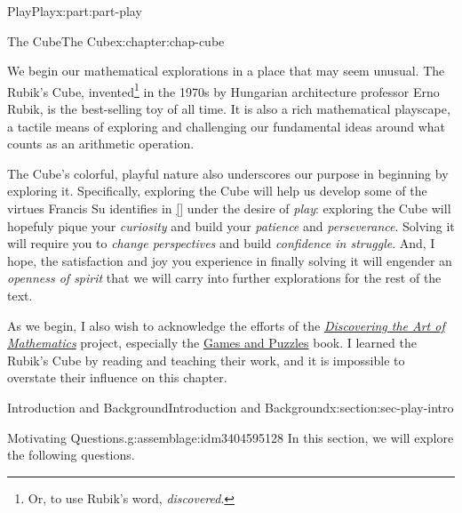 \documentclass[oneside,10pt,]{book}
\newcommand{\xreffont}{\relax}
\numberwithin{equation}{section}
\begin{document}
\begin{partptx}{Play}{}{Play}{}{}{x:part:part-play}
%
\typeout{************************************************}
\typeout{************************************************}
%
\begin{chapterptx}{The Cube}{}{The Cube}{}{}{x:chapter:chap-cube}
\begin{introduction}{}%
We begin our mathematical explorations in a place that may seem unusual. The Rubik's Cube, invented\footnote{Or, to use Rubik's word, \emph{discovered}.\label{g:fn:idm3404603496}} in the 1970s by Hungarian architecture professor Erno Rubik, is the best-selling toy of all time. It is also a rich mathematical playscape, a tactile means of exploring and challenging our fundamental ideas around what counts as an arithmetic operation.%
\par
The Cube's colorful, playful nature also underscores our purpose in beginning by exploring it. Specifically, exploring the Cube will help us develop some of the virtues Francis Su identifies in \hyperlink{x:biblio:Su2020}{[{\xreffont 1}]} under the desire of \emph{play}: exploring the Cube will hopefuly pique your \emph{curiosity} and build your \emph{patience} and \emph{perseverance}. Solving it will require you to \emph{change perspectives} and build \emph{confidence in struggle}. And, I hope, the satisfaction and joy you experience in finally solving it will engender an \emph{openness of spirit} that we will carry into further explorations for the rest of the text.%
\par
As we begin, I also wish to acknowledge the efforts of the \emph{\href{https://www.artofmathematics.org/}{Discovering the Art of Mathematics}} project, especially the \href{https://www.artofmathematics.org/books/games-and-puzzles}{Games and Puzzles} book. I learned the Rubik's Cube by reading and teaching their work, and it is impossible to overstate their influence on this chapter.%
\end{introduction}%
%
%
\typeout{************************************************}
\typeout{************************************************}
%
\begin{sectionptx}{Introduction and Background}{}{Introduction and Background}{}{}{x:section:sec-play-intro}
\begin{introduction}{}%
\begin{assemblage}{Motivating Questions.}{g:assemblage:idm3404595128}%
In this section, we will explore the following questions. %

\end{assemblage}
\end{introduction}
\end{sectionptx}
\end{chapterptx}
\end{partptx}
\end{document}
